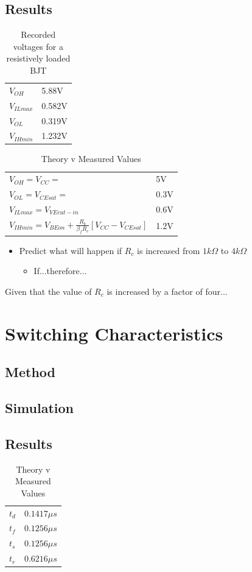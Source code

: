 \documentclass[12pt]{article}
\begin{document}
\subsection{Results}
\begin{table}[h]
\centering
\begin{tabular}{ll}
$V_{OH}$ 		& 5.88V \\
$V_{IL max}$ 	& 0.582V \\
$V_{OL}$ 		& 0.319V \\
$V_{IH min}$ 	& 1.232V
\end{tabular}
\caption{Recorded voltages for a resistively loaded BJT}
\end{table}
\begin{table}[h]
\centering
\begin{tabular}{ll}
$V_{OH}=V_{CC}=$ & 5V\\
$V_{OL}=V_{CE sat}=$ & 0.3V\\
$V_{IL max}=V_{VE cut-in}$ & 0.6V\\
$V_{IH min}=V_{BE on} + \frac{R_{b}}{\beta_{f}R_{c}}\left[V_{CC}-V_{CE sat}\right]$ & 1.2V
\end{tabular}
\caption{Theory v Measured Values}
\end{table}

\begin{itemize}
\item Predict what will happen if $R_c$ is increased from $1k\Omega$ to $4k\Omega$
\begin{itemize}
\item If...therefore...
\end{itemize}
\end{itemize}

Given that the value of $R_c$ is increased by a factor of four...
\section{Switching Characteristics}
\subsection{Method}
\subsection{Simulation}
\subsection{Results}
\begin{table}[h]
\centering
\begin{tabular}{ll}
$t_d$ & $0.1417\mu s$\\
$t_f$ & $0.1256\mu s$\\
$t_s$ & $0.1256\mu s$\\
$t_r$ & $0.6216\mu s$
\end{tabular}
\caption{Theory v Measured Values}
\end{table}
\end{document}
